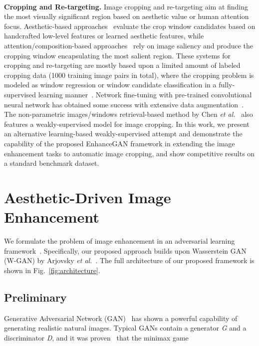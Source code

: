 \documentclass[sigconf]{acmart}
\newcommand{\etal}{\textit{et al.}}
\begin{document}
\\
\noindent\textbf{Cropping and Re-targeting.} 
Image cropping and re-targeting aim at finding the most visually significant region based on aesthetic value or human attention focus. Aesthetic-based approaches~\cite{chen2016automatic,islam2016survey,yan2013learning,chen2017learning} evaluate the crop window candidates based on handcrafted low-level features or learned aesthetic features, while attention/composition-based approaches~\cite{fang2014automatic,choi2016object,huang2015automatic,jaiswal2015saliency} rely on image saliency and produce the cropping window encapsulating the most salient region. 
These systems for cropping and re-targeting are mostly based upon a limited amount of labeled cropping data (1000 training image pairs in total), where the cropping problem is modeled as window regression or window candidate classification in a fully-supervised learning manner~\cite{chen2016automatic,chen2017quantitative}. Network fine-tuning with pre-trained convolutional neural network has obtained some success with extensive data augmentation~\cite{deng2017image}.
\color{black}
The non-parametric images/windows retrieval-based method by Chen \etal~\cite{chen2017learning} also features a weakly-supervised model for image cropping. 
\color{black}
In this work, we present an alternative learning-based weakly-supervised attempt and demonstrate the capability of the proposed EnhanceGAN framework in extending the image enhancement tasks to automatic image cropping, and show competitive results on a standard benchmark dataset. 
\\






\section{Aesthetic-Driven Image Enhancement}
\label{sec:methodology}
We formulate the problem of image enhancement in an adversarial learning framework~\cite{goodfellow2014generative}. Specifically, our proposed approach builds upon Wasserstein GAN (W-GAN) by Arjovsky \etal~\cite{arjovsky2017wasserstein}. The full architecture of our proposed framework is shown in Fig.~\ref{fig:architecture}. 


\subsection{Preliminary}
Generative Adversarial Network (GAN)~\cite{goodfellow2014generative} has shown a powerful capability of generating realistic natural images. Typical GANs contain a generator \textit{G} and a discriminator \textit{D}, and it was proven~\cite{goodfellow2014generative} that the minimax game
\end{document}
